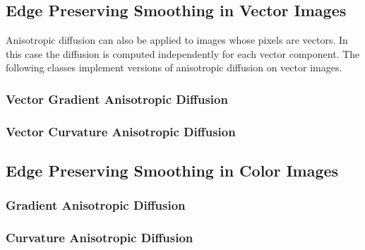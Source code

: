 \ifitkFullVersion

\fi



\subsection{Edge Preserving Smoothing in Vector Images}
\label{sec:VectorAnisotropicDiffusion}

Anisotropic diffusion can also be applied to images whose pixels are vectors.
In this case the diffusion is computed independently for each vector
component.  The following classes implement versions of anisotropic diffusion
on vector images.

\subsubsection{Vector Gradient Anisotropic Diffusion}
\label{sec:VectorGradientAnisotropicDiffusionImageFilter}

\ifitkFullVersion

\fi

\subsubsection{Vector Curvature Anisotropic Diffusion}
\label{sec:VectorCurvatureAnisotropicDiffusionImageFilter}

\ifitkFullVersion

\fi



\subsection{Edge Preserving Smoothing in Color Images}
\label{sec:ColorAnisotropicDiffusion}

\subsubsection{Gradient Anisotropic Diffusion}
\label{sec:ColorGradientAnisotropicDiffusion}

\ifitkFullVersion

\fi

\subsubsection{Curvature Anisotropic Diffusion}
\label{sec:ColorCurvatureAnisotropicDiffusion}

